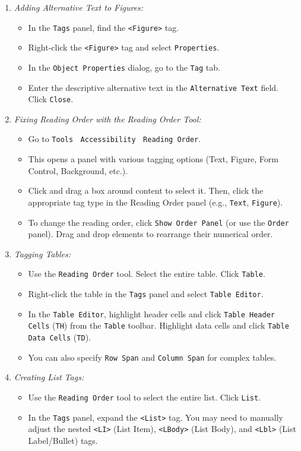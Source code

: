 \begin{enumerate}
\begin{itemize}
    \end{itemize}
\item \emph{Adding Alternative Text to Figures:}
    \begin{itemize}
    \item In the \texttt{Tags} panel, find the \texttt{<Figure>} tag.
    \item Right-click the \texttt{<Figure>} tag and select \texttt{Properties}.
    \item In the \texttt{Object Properties} dialog, go to the \texttt{Tag} tab.
    \item Enter the descriptive alternative text in the \texttt{Alternative Text} field. Click \texttt{Close}.
    \end{itemize}
\item \emph{Fixing Reading Order with the Reading Order Tool:}
    \begin{itemize}
    \item Go to \texttt{Tools} $\>$ \texttt{Accessibility} $\>$ \texttt{Reading Order}.
    \item This opens a panel with various tagging options (Text, Figure, Form Control, Background, etc.).
    \item Click and drag a box around content to select it. Then, click the appropriate tag type in the Reading Order panel (e.g., \texttt{Text}, \texttt{Figure}).
    \item To change the reading order, click \texttt{Show Order Panel} (or use the \texttt{Order} panel). Drag and drop elements to rearrange their numerical order.
    \end{itemize}
\item \emph{Tagging Tables:}
    \begin{itemize}
    \item Use the \texttt{Reading Order} tool. Select the entire table. Click \texttt{Table}.
    \item Right-click the table in the \texttt{Tags} panel and select \texttt{Table Editor}.
    \item In the \texttt{Table Editor}, highlight header cells and click \texttt{Table Header Cells} (\texttt{TH}) from the \texttt{Table} toolbar. Highlight data cells and click \texttt{Table Data Cells} (\texttt{TD}).
    \item You can also specify \texttt{Row Span} and \texttt{Column Span} for complex tables.
    \end{itemize}
\item \emph{Creating List Tags:}
    \begin{itemize}
    \item Use the \texttt{Reading Order} tool to select the entire list. Click \texttt{List}.
    \item In the \texttt{Tags} panel, expand the \texttt{<List>} tag. You may need to manually adjust the nested \texttt{<LI>} (List Item), \texttt{<LBody>} (List Body), and \texttt{<Lbl>} (List Label/Bullet) tags.
    \end{itemize}
\end{enumerate}

